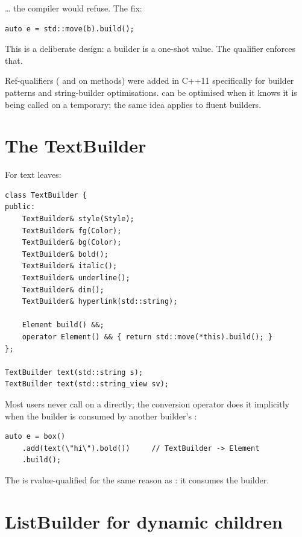 \ldots{} the compiler would refuse. The fix:

\begin{lstlisting}
auto e = std::move(b).build();
\end{lstlisting}

This is a deliberate design: a builder is a one-shot value. The
\code{\&\&} qualifier enforces that.

\begin{funfact}
Ref-qualifiers (\code{\&} and \code{\&\&} on methods) were added
in C++11 specifically for builder patterns and string-builder
optimisations.  can be optimised
when it knows it is being called on a temporary; the same idea
applies to fluent builders.
\end{funfact}

\section{The TextBuilder}

For text leaves:

\begin{lstlisting}
class TextBuilder {
public:
    TextBuilder& style(Style);
    TextBuilder& fg(Color);
    TextBuilder& bg(Color);
    TextBuilder& bold();
    TextBuilder& italic();
    TextBuilder& underline();
    TextBuilder& dim();
    TextBuilder& hyperlink(std::string);

    Element build() &&;
    operator Element() && { return std::move(*this).build(); }
};

TextBuilder text(std::string s);
TextBuilder text(std::string_view sv);
\end{lstlisting}

Most users never call  on a 
directly; the conversion operator does it implicitly when the
builder is consumed by another builder's :

\begin{lstlisting}
auto e = box()
    .add(text(\"hi\").bold())     // TextBuilder -> Element
    .build();
\end{lstlisting}

The  is rvalue-qualified for the same
reason as : it consumes the builder.

\section{ListBuilder for dynamic children}

